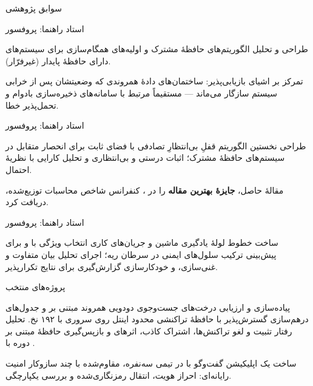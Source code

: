 \documentclass[11pt]{article}
\begin{document}
\begin{faSection}{سوابق پژوهشی}

استاد راهنما: پروفسور 
\begin{faItems}
  \item طراحی و تحلیل الگوریتم‌های حافظۀ مشترک و اولیه‌های همگام‌سازی برای سیستم‌های دارای حافظۀ پایدار (غیرفرّار).
  \item تمرکز بر اشیای بازیابی‌پذیر: ساختمان‌های دادۀ همروندی که وضعیتشان پس از خرابی سیستم سازگار می‌ماند --- مستقیماً مرتبط با سامانه‌های ذخیره‌سازی بادوام و تحمل‌پذیر خطا.
\end{faItems}

استاد راهنما: پروفسور 
\begin{faItems}
  \item طراحی نخستین الگوریتم قفلِ بی‌انتظارِ تصادفی با فضای ثابت برای انحصار متقابل در سیستم‌های حافظۀ مشترک؛ اثبات درستی و بی‌انتظاری و تحلیل کارایی با نظریۀ احتمال.
  \item مقالۀ حاصل، \textbf{جایزۀ بهترین مقاله} را در ، کنفرانس شاخص محاسبات توزیع‌شده، دریافت کرد.
\end{faItems}

استاد راهنما: پروفسور 
\begin{faItems}
  \item ساخت خطوط لولۀ یادگیری ماشین و جریان‌های کاری انتخاب ویژگی با  و  برای پیش‌بینی ترکیب سلول‌های ایمنی در سرطان ریه؛ اجرای تحلیل بیان متفاوت و غنی‌سازی، و خودکارسازی گزارش‌گیری برای نتایج تکرارپذیر.
\end{faItems}

\end{faSection}

\begin{faSection}{پروژه‌های منتخب}

پیاده‌سازی و ارزیابی درخت‌های جست‌وجوی دودویی همروند مبتنی بر  و جدول‌های درهم‌سازی گسترش‌پذیر با حافظۀ تراکنشی محدود اینتل روی سروری  با ۱۹۲ نخ. تحلیل رفتار تثبیت و لغو تراکنش‌ها، اشتراک کاذب، اثرهای  و بازپس‌گیری حافظۀ مبتنی بر دوره با .

\vspace{0.4em}
ساخت یک اپلیکیشن گفت‌وگو با  در تیمی سه‌نفره، مقاوم‌شده با چند سازوکار امنیت رایانه‌ای: احراز هویت، انتقال رمزنگاری‌شده و بررسی یکپارچگی.

\end{faSection}
\end{document}
